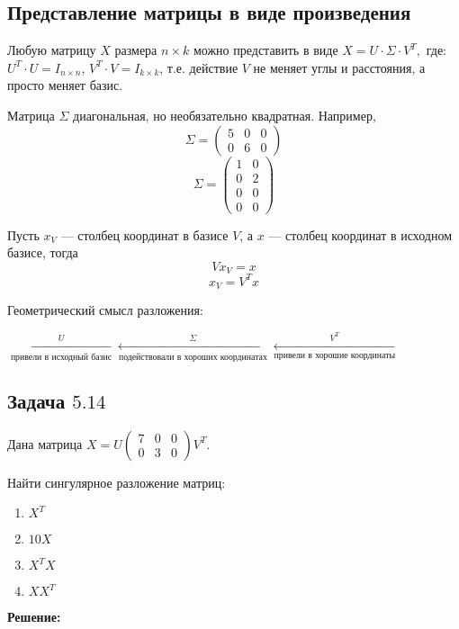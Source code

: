 \documentclass[12pt]{article} %
\theoremstyle{definition} %
\begin{document}
\subsection{Представление матрицы в виде произведения}
Любую матрицу $X$ размера $n \times k$ можно представить в виде $X = U \cdot \Sigma \cdot V^T,$ где:
$U^T\cdot U = I_{n \times n}$, $V^T\cdot V = I_{k \times k}$, т.е. действие $V$ не меняет углы и расстояния, а просто меняет базис.

Матрица $\Sigma$ диагональная, но необязательно квадратная. Например, \[\Sigma= \begin{pmatrix}
5 & 0 & 0  \\
0 & 6 & 0
\end{pmatrix}
\]
\[\Sigma= \begin{pmatrix}
1 & 0  \\
0 & 2  \\
0 & 0  \\
0 & 0
\end{pmatrix}
\]

Пусть $x_V$ — столбец координат в базисе $V$, а $x$ — столбец координат в исходном базисе, тогда
\[Vx_V=x
\]
\[x_V=V^T x
\]

Геометрический смысл разложения:
\begin{center}
$\xleftarrow
    [\text{привели в исходный базис}] 
    {U}
\xleftarrow
    [\text{подействовали в хороших координатах}]
    {\Sigma}
\xleftarrow
    [\text{привели в хорошие координаты}]
    {V^T}$
\end{center}


\subsection{Задача \href{https://github.com/bdemeshev/metrics_pro/raw/master/metrics_pro.pdf}{$5.14$}}
Дана матрица
$X= U\begin{pmatrix}
7 & 0 & 0 \\
0 & 3 & 0
\end{pmatrix} V^T$.

Найти сингулярное разложение матриц:

\begin{enumerate}
\item $X^T$
\item $10X$
\item $X^TX$
\item $XX^T$
\end{enumerate}

\textbf{Решение:}
\end{document}
